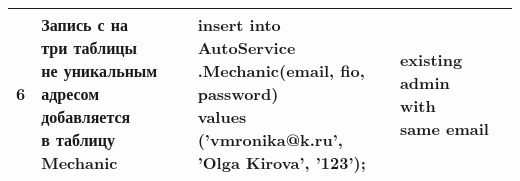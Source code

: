 \begin{table}[H]
\begin{tabular}{|l|l|l|l|}
		6 & \makecell{Запись с на\\три таблицы\\не уникальным\\адресом добавляется\\в таблицу \textbf{Mechanic}} & \makecell{insert into AutoService\\.Mechanic(email, fio,\\password)\\values ('vmronika@k.ru',\\'Olga Kirova', '123');} & \makecell{existing admin\\with\\same email} \\\hline
	\end{tabular}
\end{table}

